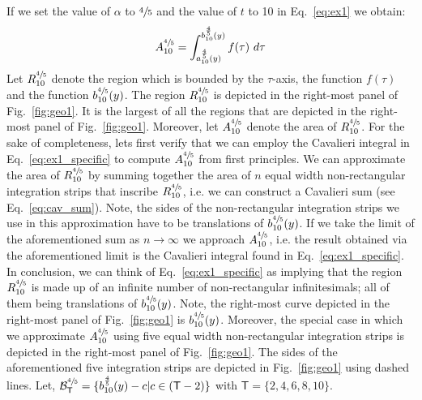 \documentclass{article}
\theoremstyle{theorem}
\theoremstyle{definition}
\begin{document}
\noindent
If we set the value of $\alpha$ to $\sfrac{4}{5}$ and the value of $t$ to 10 in Eq.~\eqref{eq:ex1} we obtain:
\begin{equation}
\label{eq:ex1_specific}
A_{10}^{\sfrac{4}{5}}=\int_{a_{10}^{\frac{4}{5}}(y)}^{b_{10}^{\frac{4}{5}}(y)} f(\tau)~d\tau 
\end{equation}
Let $R_{10}^{\sfrac{4}{5}}$ denote the region which is bounded by the $\tau$-axis, the function $f(\tau)$ and the function $b_{10}^{\sfrac{4}{5}}(y)$. The region $R_{10}^{\sfrac{4}{5}}$ is depicted in the right-most panel of Fig.~\ref{fig:geo1}. It is the largest of all the 
regions that are depicted in the right-most panel of Fig.~\ref{fig:geo1}. Moreover, let $A_{10}^{\sfrac{4}{5}}$ denote the area of $R_{10}^{\sfrac{4}{5}}$. For the sake of completeness, lets first verify that we can employ the Cavalieri integral in Eq.~\ref{eq:ex1_specific} to compute $A_{10}^{\sfrac{4}{5}}$ from first principles.
We can approximate the area of $R_{10}^{\sfrac{4}{5}}$ by summing together the area of $n$ equal width non-rectangular integration strips that inscribe $R_{10}^{\sfrac{4}{5}}$, i.e. we can 
construct a Cavalieri sum (see Eq.~\eqref{eq:cav_sum}). Note, the sides of the non-rectangular integration strips we use in this approximation have to be translations of $b_{10}^{\sfrac{4}{5}}(y)$.
If we take the limit of the aforementioned sum as $n\rightarrow \infty$ we approach $A_{10}^{\sfrac{4}{5}}$, i.e. the result obtained via the aforementioned limit is the Cavalieri integral found in Eq.~\eqref{eq:ex1_specific}. In conclusion, we can think of Eq.~\eqref{eq:ex1_specific} as implying that the region $R_{10}^{\sfrac{4}{5}}$ is made up 
of an infinite number of non-rectangular infinitesimals; all of them being translations of $b_{10}^{\sfrac{4}{5}}(y)$. Note, the right-most curve depicted in the right-most panel of Fig.~\ref{fig:geo1} is $b_{10}^{\sfrac{4}{5}}(y)$.  Moreover, the special case in which we approximate $A_{10}^{\sfrac{4}{5}}$ using five equal width non-rectangular integration strips is depicted in the right-most panel of Fig.~\ref{fig:geo1}. 
The sides of the aforementioned five integration strips are depicted in Fig.~\ref{fig:geo1} using dashed lines. Let, $\mathcal{B}_{\mathsf{T}}^{\sfrac{4}{5}}=\{b_{10}^{\frac{4}{5}}(y)-c|c\in(\mathsf{T}-2)\}$ with $\mathsf{T}=\{2,4,6,8,10\}$.\\ 

\end{document}
